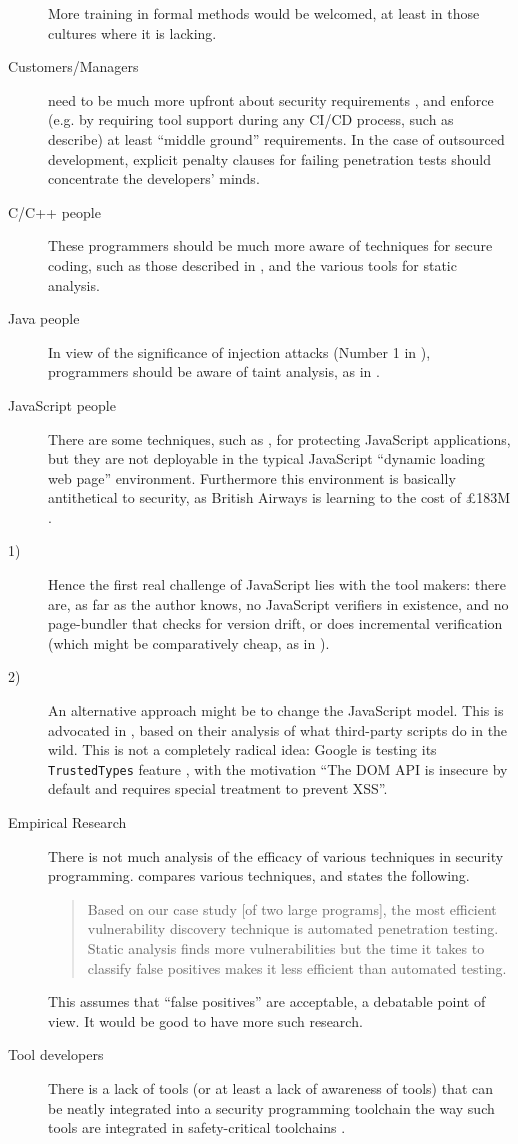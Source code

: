 \documentclass{llncs}
\begin{document}
\begin{description}
More training in formal methods would be welcomed, at least in those cultures where it is lacking.
\item[Customers/Managers]need to be much more upfront about security requirements \cite{Naiakshinaetal2018a,Naiakshinaetal2019a}, and enforce (e.g. by requiring tool support during any CI/CD process, such as \cite{BrainSchanda2012a} describe) at least ``middle ground'' requirements. In the case of outsourced development, explicit penalty clauses for failing penetration tests should concentrate the developers' minds.
\item[C/C++ people]These programmers should be much more aware of techniques for secure coding, such as those described in  \cite[Appendix F]{CPNI2019a}, and the various tools for static analysis.
\item[Java people]In view of the significance of injection attacks (Number 1 in \cite{OWASP2017a}), programmers should be aware of taint analysis, as in \cite{LivshitsLam2005}.
\item[JavaScript people]There are some techniques, such as \cite{Maffeisetal2009},  for protecting JavaScript applications, but they are not deployable in the typical JavaScript ``dynamic loading web page'' environment. Furthermore this environment is basically antithetical to security, as British Airways is learning to the cost of \pounds183M \cite{Guardian2019i}.
\item[1)]Hence the first real challenge of JavaScript lies with the tool makers: there are, as far as the author knows, no JavaScript verifiers in existence, and no page-bundler that checks for version drift, or does incremental verification (which might be comparatively cheap, as in \cite{BrainSchanda2012a}).
\item[2)]An alternative approach might be to change the JavaScript model. This is advocated in \cite{Zhangetal2019c}, based on their analysis of what third-party scripts do in the wild.  This is not a completely radical idea: Google is testing its \verb+TrustedTypes+ feature \cite{Kotowicz2019a}, with the motivation ``The DOM API is insecure by default and requires special treatment to prevent XSS''.
\item[Empirical Research]There is not much analysis of the efficacy of various techniques in security programming. \cite{AustinWilliams2011a} compares various techniques, and states the following.
\begin{quote}
Based on our case study [of two large programs], the most efficient vulnerability discovery technique is automated penetration testing.  Static analysis finds more vulnerabilities but the time it takes to classify false positives makes it less efficient than automated testing.
\end{quote}
This assumes that ``false positives'' are acceptable, a debatable point of view.  It would be good to have more such research.
\item[Tool developers]There is a lack of tools (or at least a lack of awareness of tools) that can be neatly integrated into a security programming toolchain the way such tools are integrated in safety-critical toolchains \cite{BrainSchanda2012a}.
\end{description}
\end{document}
